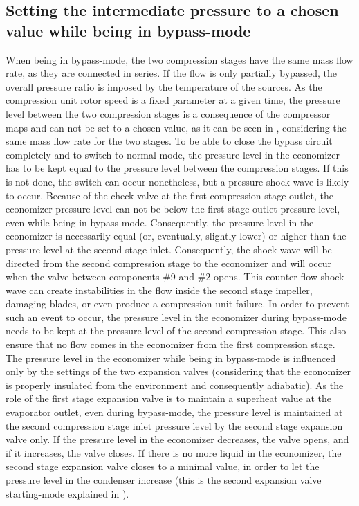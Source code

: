 \subsection{Setting the intermediate pressure to a chosen value while being in bypass-mode}
\label{sec:bwp-bypass-mode-Pint-issue}

When being in bypass-mode, the two compression stages have the same
mass flow rate, as they are connected in series. If the flow is only
partially bypassed, the overall pressure ratio is imposed by the
temperature of the sources. As the compression unit rotor speed is a
fixed parameter at a given time, the pressure level between the two
compression stages is a consequence of the compressor maps and can not
be set to a chosen value, as it can be seen in
, considering the same mass flow rate
for the two stages. To be able to close the bypass circuit completely
and to switch to normal-mode, the pressure level in the economizer has
to be kept equal to the pressure level between the compression
stages. If this is not done, the switch can occur nonetheless, but a
pressure shock wave is likely to occur. Because of the check valve at
the first compression stage outlet, the economizer pressure level can
not be below the first stage outlet pressure level, even while being
in bypass-mode. Consequently, the pressure level in the economizer is
necessarily equal (or, eventually, slightly lower) or higher than the
pressure level at the second stage inlet. Consequently, the shock wave
will be directed from the second compression stage to the economizer
and will occur when the valve between components \#9 and \#2
opens. This counter flow shock wave can create instabilities in the
flow inside the second stage impeller, damaging blades, or even
produce a compression unit failure. In order to prevent such an event
to occur, the pressure level in the economizer during bypass-mode needs
to be kept at the pressure level of the second compression stage. This
also ensure that no flow comes in the economizer from the first
compression stage.  The pressure level in the economizer while being
in bypass-mode is influenced only by the settings of the two expansion
valves (considering that the economizer is properly insulated from the
environment and consequently adiabatic). As the role of the first
stage expansion valve is to maintain a superheat value at the
evaporator outlet, even during bypass-mode, the pressure level is
maintained at the second compression stage inlet pressure level by the
second stage expansion valve only. If the pressure level in the
economizer decreases, the valve opens, and if it increases, the valve
closes. If there is no more liquid in the economizer, the second stage
expansion valve closes to a minimal value, in order to let the
pressure level in the condenser increase (this is the second expansion
valve starting-mode explained in ).


